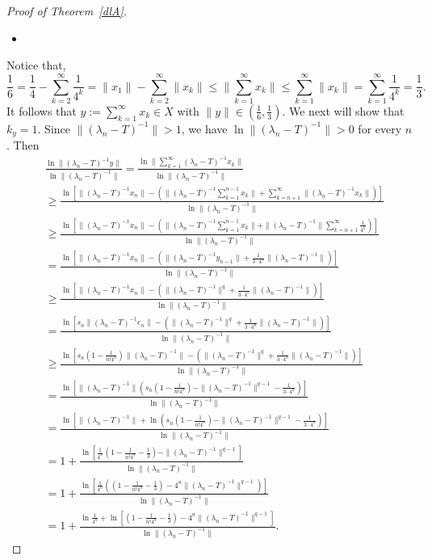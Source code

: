 \documentclass[12pt]{amsart}
\numberwithin{equation}{section}
\theoremstyle{plain}
\theoremstyle{definition}
\begin{document}
\begin{proof}[Proof of Theorem~\ref{dlA}]
\begin{itemize}
  \item [\textbf{STEP 2.}]
\end{itemize}
Notice that,
$$\frac{1}{6}=\frac{1}{4}-\sum_{k=2}^{\infty}\frac{1}{4^k}=\|x_1\|-\sum_{k=2}^{\infty}\|x_k\|\leq\|\sum_{k=1}^{\infty}x_k\|\leq\sum_{k=1}^{\infty}\|x_k\|=\sum_{k=1}^{\infty}\frac{1}{4^k}=\frac{1}{3}.$$
It follows that $y:=\sum_{k=1}^{\infty}x_k\in X$ with $\|y\|\in (\frac{1}{6},\frac{1}{3})$.
We next will show that $k_y=1$.
Since $\|(\lambda_n-T)^{-1}\|>1$, we have $\ln\|(\lambda_n-T)^{-1}\|>0$ for every $n$.
Then
\begin{align*}
&\frac{\ln\|(\lambda_n-T)^{-1}y\|}{\ln\|(\lambda_n-T)^{-1}\|}
=
\frac{\ln\|\sum\limits_{k=1}^{\infty}(\lambda_n-T)^{-1}x_k\|}{\ln\|(\lambda_n-T)^{-1}\|}\\
&\geq
\frac{\ln\left[\|(\lambda_n-T)^{-1}x_n\|-\left(\|(\lambda_n-T)^{-1}\sum\limits_{k=1}^{n-1}x_k\|+\sum\limits_{k=n+1}^{\infty}\|(\lambda_n-T)^{-1}x_k\|\right)\right]}
{\ln\|(\lambda_n-T)^{-1}\|}\\
&\geq
\frac{\ln\left[\|(\lambda_n-T)^{-1}x_n\|-\left(\|(\lambda_n-T)^{-1}\sum\limits_{k=1}^{n-1}x_k\|+\|(\lambda_n-T)^{-1}\|\sum\limits_{k=n+1}^{\infty}\frac{1}{4^k}\right)\right]}
{\ln\|(\lambda_n-T)^{-1}\|}\\
&=
\frac{\ln\left[\|(\lambda_n-T)^{-1}x_n\|-\left(\|(\lambda_n-T)^{-1}y_{n-1}\|+
\frac{1}{3\cdot4^n}\|(\lambda_n-T)^{-1}\|\right)\right]}
{\ln\|(\lambda_n-T)^{-1}\|}\\
&\geq
\frac{\ln\left[\|(\lambda_n-T)^{-1}x_n\|-\left(\|(\lambda_n-T)^{-1}\|^q+\frac{1}{3\cdot4^n}\|(\lambda_n-T)^{-1}\|\right)\right]}
{\ln\|(\lambda_n-T)^{-1}\|}\\
&=
\frac{\ln \left[s_n\|(\lambda_n-T)^{-1}e_n\|-\left(\|(\lambda_n-T)^{-1}\|^q+\frac{1}{3\cdot4^n}\|(\lambda_n-T)^{-1}\|\right)\right]}
  {\ln\|(\lambda_n-T)^{-1}\|}\\
&\geq
\frac{\ln \left[s_n(1-\frac{1}{n!4^n})\|(\lambda_n-T)^{-1}\|-\left(\|(\lambda_n-T)^{-1}\|^q+\frac{1}{3\cdot4^n}\|(\lambda_n-T)^{-1}\|\right)\right]}
{\ln\|(\lambda_n-T)^{-1}\|}\\
&=
\frac{\ln \left[\|(\lambda_n-T)^{-1}\|\left(s_n(1-\frac{1}{n!4^n})-\|(\lambda_n-T)^{-1}\|^{q-1}-\frac{1}{3\cdot4^n}\right)\right]}
{\ln\|(\lambda_n-T)^{-1}\|}\\
&=
\frac{\ln \left[\|(\lambda_n-T)^{-1}\|+\ln\left(s_n(1-\frac{1}{n!4^n})-\|(\lambda_n-T)^{-1}\|^{q-1}-\frac{1}{3\cdot4^n}\right)\right]}
{\ln\|(\lambda_n-T)^{-1}\|}\\
&=
1+\frac{\ln\left[\frac{1}{4^n}(1-\frac{1}{n!4^n}-\frac{1}{3})-\|(\lambda_n-T)^{-1}\|^{q-1}\right]}
{\ln\|(\lambda_n-T)^{-1}\|}\\
&=1+\frac{\ln\left[\frac{1}{4^n}\left((1-\frac{1}{n!4^n}-\frac{1}{3})-4^n\|(\lambda_n-T)^{-1}\|^{q-1}\right)\right]}
{\ln\|(\lambda_n-T)^{-1}\|}\\
&=1+\frac{\ln\frac{1}{4^n}+\ln\left[(1-\frac{1}{n!4^n}-\frac{1}{3})-4^n\|(\lambda_n-T)^{-1}\|^{q-1}\right]}
{\ln\|(\lambda_n-T)^{-1}\|}.
\end{align*}


\end{proof}
\end{document}
